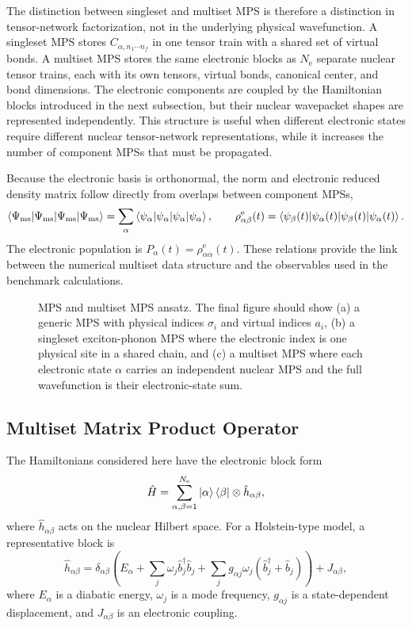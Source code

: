 \documentclass[journal=jctcce,manuscript=article]{achemso}
\newcommand{\placeholder}[1]{\textcolor{red}{#1}}
\newcommand{\figureplaceholder}[2]{%
\begin{figure}[htbp]
    \centering
    \fbox{%
    \begin{minipage}[c][0.24\textheight][c]{0.82\textwidth}
        \centering
        \textbf{Figure dummy: #1}\\[0.5em]
        \placeholder{#2}
    \end{minipage}}
    \caption{#2}
    \label{fig:#1}
\end{figure}}
\begin{document}
The distinction between singleset and multiset MPS is therefore a distinction in tensor-network factorization, not in the underlying physical wavefunction. A singleset MPS stores \(C_{\alpha,n_1\cdots n_f}\) in one tensor train with a shared set of virtual bonds. A multiset MPS stores the same electronic blocks as \(N_{\mathrm e}\) separate nuclear tensor trains, each with its own tensors, virtual bonds, canonical center, and bond dimensions. The electronic components are coupled by the Hamiltonian blocks introduced in the next subsection, but their nuclear wavepacket shapes are represented independently. This structure is useful when different electronic states require different nuclear tensor-network representations, while it increases the number of component MPSs that must be propagated.

Because the electronic basis is orthonormal, the norm and electronic reduced density matrix follow directly from overlaps between component MPSs,
\begin{equation}
    \braket{\Psi_{\mathrm{ms}}|\Psi_{\mathrm{ms}}} =
    \sum_{\alpha}\braket{\psi_{\alpha}|\psi_{\alpha}},
    \qquad
    \rho^{\mathrm e}_{\alpha\beta}(t)=\braket{\psi_{\beta}(t)|\psi_{\alpha}(t)}.
    \label{eq:rhoel-pop}
\end{equation}
The electronic population is \(P_{\alpha}(t)=\rho^{\mathrm e}_{\alpha\alpha}(t)\). These relations provide the link between the numerical multiset data structure and the observables used in the benchmark calculations.

\figureplaceholder{mps-multiset-ansatz}{MPS and multiset MPS ansatz. The final figure should show (a) a generic MPS with physical indices \(\sigma_i\) and virtual indices \(a_i\), (b) a singleset exciton-phonon MPS where the electronic index is one physical site in a shared chain, and (c) a multiset MPS where each electronic state \(\alpha\) carries an independent nuclear MPS and the full wavefunction is their electronic-state sum.}

\subsection{Multiset Matrix Product Operator}

The Hamiltonians considered here have the electronic block form
\begin{equation}
    \hat H = \sum_{\alpha,\beta=1}^{N_{\mathrm e}}\ket{\alpha}\bra{\beta}\otimes \hat h_{\alpha\beta},
    \label{eq:block-hamiltonian}
\end{equation}
where \(\hat h_{\alpha\beta}\) acts on the nuclear Hilbert space. For a Holstein-type model, a representative block is
\begin{equation}
    \hat h_{\alpha\beta}=\delta_{\alpha\beta}
    \left(E_{\alpha}+\sum_j\omega_j\hat b_j^{\dagger}\hat b_j+
    \sum_j g_{\alpha j}\omega_j(\hat b_j^{\dagger}+\hat b_j)\right)+J_{\alpha\beta},
    \label{eq:holstein-block}
\end{equation}
where \(E_{\alpha}\) is a diabatic energy, \(\omega_j\) is a mode frequency, \(g_{\alpha j}\) is a state-dependent displacement, and \(J_{\alpha\beta}\) is an electronic coupling.
\end{document}
